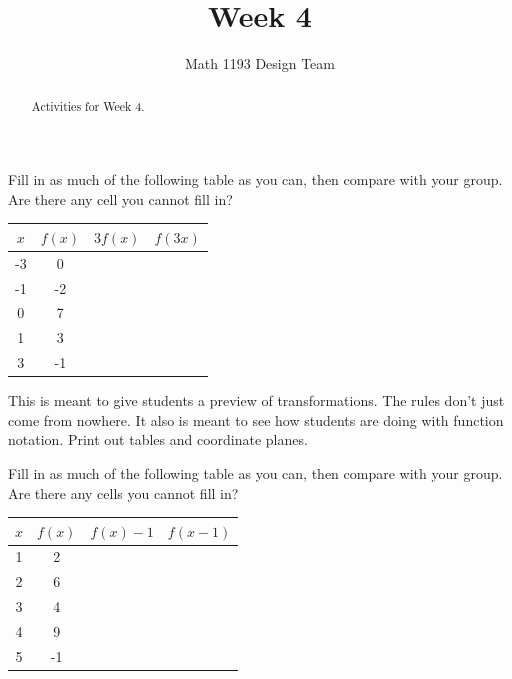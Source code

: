 \documentclass[noauthor,noinstructornotes]{ximera}
\title{Week 4}
\author{Math 1193 Design Team}
\begin{document}
\begin{abstract}
    Activities for Week 4.
\end{abstract}
\maketitle

\begin{problem}
Fill in as much of the following table as you can, then 
compare with your group. Are there any cell you cannot fill in?

\begin{center}
\begin{tabular}{|c|c|c|c|} 
 \hline
 \(x\) & \(f(x)\) & \(3f(x)\) & \(f(3x)\) \\
 \hline\hline
 -3 & 0 &  &  \\ 
 \hline
 -1 & -2 &  &  \\
 \hline
 0 & 7 &  &  \\
 \hline
 1 & 3 &  &  \\
 \hline
 3 & -1 &  &  \\
 \hline
\end{tabular}
\end{center}

\begin{instructorNotes}
This is meant to give students a preview of transformations. The rules don't
just come from nowhere. It also is meant to see how students are doing
with function notation. Print out tables and coordinate planes.
\end{instructorNotes}
\end{problem}

\begin{problem}
Fill in as much of the following table as you can, then 
compare with your group. Are there any cells you cannot fill in?

\begin{center}
\begin{tabular}{|c|c|c|c|} 
 \hline
 \(x\) & \(f(x)\) & \(f(x)-1\) & \(f(x - 1)\) \\
 \hline\hline
 1 & 2 &  &  \\ 
 \hline
 2 & 6 &  &  \\
 \hline
 3 & 4 &  &  \\
 \hline
 4 & 9 &  &  \\
 \hline
 5 & -1 &  &  \\
 \hline
\end{tabular}
\end{center}
\end{problem}
\end{document}
